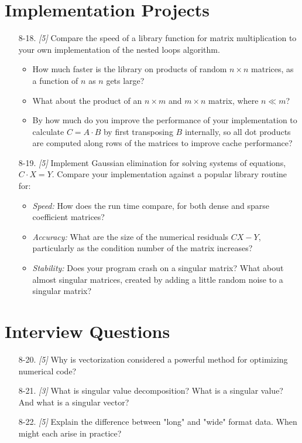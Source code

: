 \documentclass[10pt]{article}
\begin{document}
\section{Implementation Projects}
\begin{enumerate}
\item[8-18.] \textit{[5]} Compare the speed of a library function for matrix multiplication to your own implementation of the nested loops algorithm.
\begin{itemize}
\item How much faster is the library on products of random $n \times n$ matrices, as a function of $n$ as $n$ gets large?
\item What about the product of an $n \times m$ and $m \times n$ matrix, where $n \ll m$?
\item By how much do you improve the performance of your implementation to calculate $C=A \cdot B$ by first transposing $B$ internally, so all dot products are computed along rows of the matrices to improve cache performance?
\end{itemize}

\item[8-19.] \textit{[5]} Implement Gaussian elimination for solving systems of equations, $C \cdot X=Y$. Compare your implementation against a popular library routine for:
\begin{itemize}
\item \textit{Speed:} How does the run time compare, for both dense and sparse coefficient matrices?
\item \textit{Accuracy:} What are the size of the numerical residuals $CX-Y$, particularly as the condition number of the matrix increases?
\item \textit{Stability:} Does your program crash on a singular matrix? What about almost singular matrices, created by adding a little random noise to a singular matrix?
\end{itemize}
\end{enumerate}

\section{Interview Questions}
\begin{enumerate}
\item[8-20.] \textit{[5]} Why is vectorization considered a powerful method for optimizing numerical code?

\item[8-21.] \textit{[3]} What is singular value decomposition? What is a singular value? And what is a singular vector?

\item[8-22.] \textit{[5]} Explain the difference between "long" and "wide" format data. When might each arise in practice?
\end{enumerate}
\end{document}
